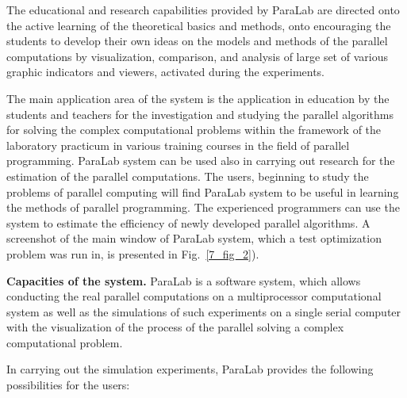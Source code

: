 The educational and research capabilities provided by ParaLab are directed onto the active learning of the theoretical basics and methods, onto encouraging the students to develop their own ideas on the models and methods of the parallel computations by visualization, comparison, and analysis of large set of various graphic indicators and viewers, activated during the experiments.

The main application area of the system is the application in education by the students and teachers for the investigation and studying the parallel algorithms for solving the complex computational problems within the framework of the laboratory practicum in various training courses in the field of parallel programming. ParaLab system can be used also in carrying out research for the estimation of the parallel computations. The users, beginning to study the problems of parallel computing will find ParaLab system to be useful in learning the methods of parallel programming. The experienced programmers can use the system to estimate the efficiency of newly developed parallel algorithms.
A screenshot of the main window of ParaLab system, which a test optimization problem was run in, is presented in Fig.~\ref{7_fig_2}).

\textbf{Capacities of the system.} ParaLab is a software system, which allows conducting the real parallel computations on a multiprocessor computational system as well as the simulations of such experiments on a single serial computer with the visualization of the process of the parallel solving a complex computational problem.

In carrying out the simulation experiments, ParaLab provides the following possibilities for the users:

